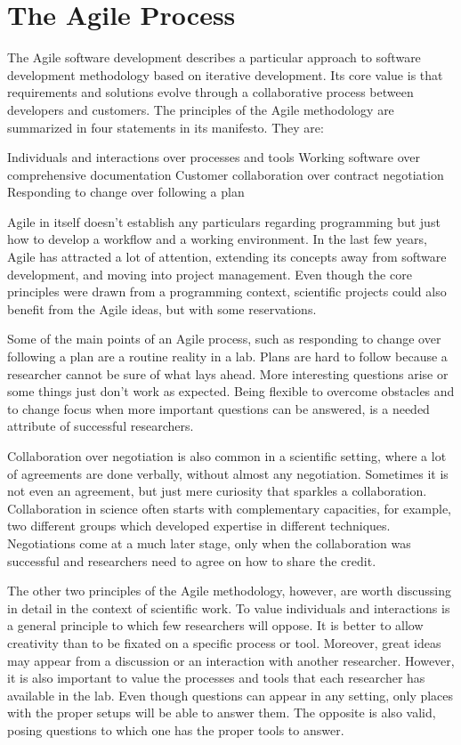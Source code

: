 \section{The Agile Process}

The Agile software development describes a particular approach to software development methodology based on iterative development. Its core value is that requirements and solutions evolve through a collaborative process between developers and customers. The principles of the Agile methodology are summarized in four statements in its manifesto. They are:

        Individuals and interactions over processes and tools
        Working software over comprehensive documentation
        Customer collaboration over contract negotiation
        Responding to change over following a plan

Agile in itself doesn’t establish any particulars regarding programming but just how to develop a workflow and a working environment. In the last few years, Agile has attracted a lot of attention, extending its concepts away from software development, and moving into project management. Even though the core principles were drawn from a programming context, scientific projects could also benefit from the Agile ideas, but with some reservations.

Some of the main points of an Agile process, such as responding to change over following a plan are a routine reality in a lab. Plans are hard to follow because a researcher cannot be sure of what lays ahead. More interesting questions arise or some things just don’t work as expected. Being flexible to overcome obstacles and to change focus when more important questions can be answered, is a needed attribute of successful researchers.

Collaboration over negotiation is also common in a scientific setting, where a lot of agreements are done verbally, without almost any negotiation. Sometimes it is not even an agreement, but just mere curiosity that sparkles a collaboration. Collaboration in science often starts with complementary capacities, for example, two different groups which developed expertise in different techniques. Negotiations come at a much later stage, only when the collaboration was successful and researchers need to agree on how to share the credit.

The other two principles of the Agile methodology, however, are worth discussing in detail in the context of scientific work. To value individuals and interactions is a general principle to which few researchers will oppose. It is better to allow creativity than to be fixated on a specific process or tool. Moreover, great ideas may appear from a discussion or an interaction with another researcher. However, it is also important to value the processes and tools that each researcher has available in the lab. Even though questions can appear in any setting, only places with the proper setups will be able to answer them. The opposite is also valid, posing questions to which one has the proper tools to answer.

